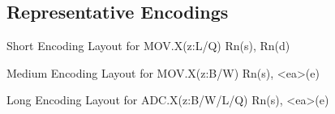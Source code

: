 \subsection{Representative Encodings}
\begin{manuallistedformatdiagram}{Short Encoding Layout for MOV.X(z:L/Q) Rn(s), Rn(d)}
\end{manuallistedformatdiagram}

\begin{manuallistedformatdiagram}{Medium Encoding Layout for MOV.X(z:B/W) Rn(s), \textless{}ea\textgreater{}(e)}
\end{manuallistedformatdiagram}

\begin{manuallistedformatdiagram}{Long Encoding Layout for ADC.X(z:B/W/L/Q) Rn(s), \textless{}ea\textgreater{}(e)}
\end{manuallistedformatdiagram}
